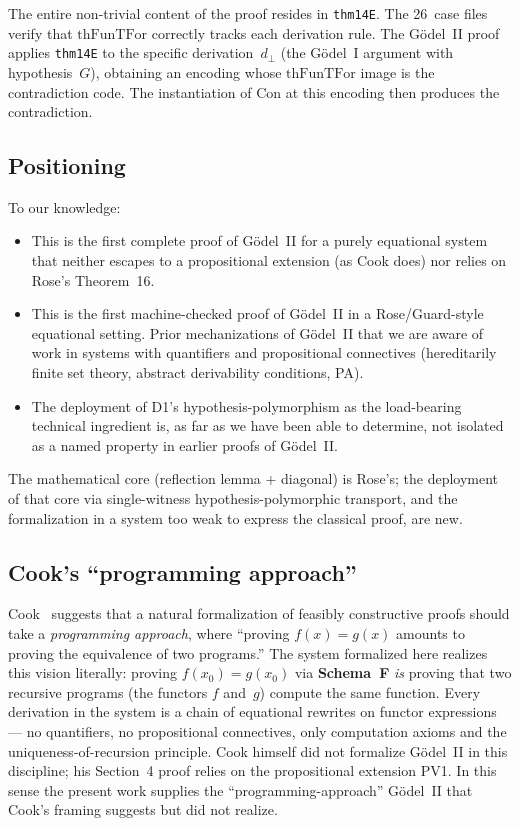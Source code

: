 \documentclass[11pt]{article}
\newcommand{\SchemaF}{\textbf{Schema~F}}
\newcommand{\thFunTFor}{\mathrm{thFunTFor}}
\begin{document}
The entire non-trivial content of the proof resides in
\texttt{thm14E}.  The 26~case files verify that $\thFunTFor$
correctly tracks each derivation rule.  The G\"odel~II proof
applies \texttt{thm14E} to the specific derivation~$d_\bot$
(the G\"odel~I argument with hypothesis~$G$), obtaining an
encoding whose $\thFunTFor$ image is the contradiction code.
The instantiation of $\mathrm{Con}$ at this encoding then
produces the contradiction.

\subsection*{Positioning}

To our knowledge:
\begin{itemize}
\item This is the first complete proof of G\"odel~II for a
  purely equational system that neither escapes to a
  propositional extension (as Cook does) nor relies on
  Rose's Theorem~16.
\item This is the first machine-checked proof of G\"odel~II
  in a Rose/Guard-style equational setting.  Prior
  mechanizations of G\"odel~II that we are aware of work in
  systems with quantifiers and propositional connectives
  (hereditarily finite set theory, abstract derivability
  conditions, PA).
\item The deployment of D1's hypothesis-polymorphism as the
  load-bearing technical ingredient is, as far as we have
  been able to determine, not isolated as a named property
  in earlier proofs of G\"odel~II.
\end{itemize}
The mathematical core (reflection lemma + diagonal) is
Rose's; the deployment of that core via single-witness
hypothesis-polymorphic transport, and the formalization in
a system too weak to express the classical proof, are new.

\subsection*{Cook's ``programming approach''}

Cook~\cite[Section~8]{cook1975} suggests that a natural
formalization of feasibly constructive proofs should take a
\emph{programming approach}, where ``proving $f(x) = g(x)$
amounts to proving the equivalence of two programs.''
The system formalized here realizes this vision literally:
proving $f(x_0) = g(x_0)$ via \SchemaF{} \emph{is} proving
that two recursive programs (the functors $f$ and~$g$)
compute the same function.  Every derivation in the system
is a chain of equational rewrites on functor expressions ---
no quantifiers, no propositional connectives, only
computation axioms and the uniqueness-of-recursion principle.
Cook himself did not formalize G\"odel~II in this discipline;
his Section~4 proof relies on the propositional extension
PV1.  In this sense the present work supplies the
``programming-approach'' G\"odel~II that Cook's framing
suggests but did not realize.
\end{document}
